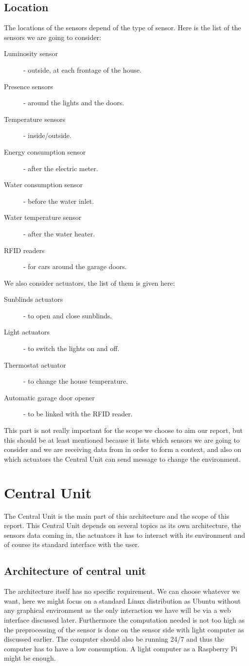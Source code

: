 \documentclass{acm_proc_article-sp}
\begin{document}
\subsection{Location}
The locations of the sensors depend of the type of sensor. Here is the list of the sensors we are going to consider:
\begin{description}
 \item[Luminosity sensor] - outside, at each frontage of the house.
 \item[Presence sensors] - around the lights and the doors.
 \item[Temperature sensors] - inside/outside.
 \item[Energy consumption sensor] - after the electric meter.
 \item[Water consumption sensor] - before the water inlet.
 \item[Water temperature sensor] - after the water heater.
 \item[RFID readers] - for cars around the garage doors.
\end{description}
We also consider actuators, the list of them is given here:
\begin{description}
 \item[Sunblinds actuators] - to open and close sunblinds.
 \item[Light actuators] - to switch the lights on and off.
 \item[Thermostat actuator] - to change the house temperature.
 \item[Automatic garage door opener] - to be linked with the RFID reader.
\end{description}
This part is not really important for the scope we choose to aim our report, but this should be at least mentioned because it lists which sensors we are going to consider and we are receiving data from in order to form a context, and also on which actuators the Central Unit can send message to change the environment.
\section{Central Unit}	
The Central Unit is the main part of this architecture and the scope of this report. 
This Central Unit depends on several topics as its own architecture, the sensors data coming in, 
the actuators it has to interact with its environment and of course its standard interface with the user.
\subsection{Architecture of central unit}
The architecture itself has no specific requirement. 
We can choose whatever we want, here we might focus on a standard Linux distribution as Ubuntu without any graphical environment as the only interaction we have will be via a web interface discussed later. 
Furthermore the computation needed is not too high as the preprocessing of the sensor is done on the sensor side with light computer as discussed earlier. 
The computer should also be running 24/7 and thus the computer has to have a low consumption. A light computer as a Raspberry Pi might be enough.
\end{document}
